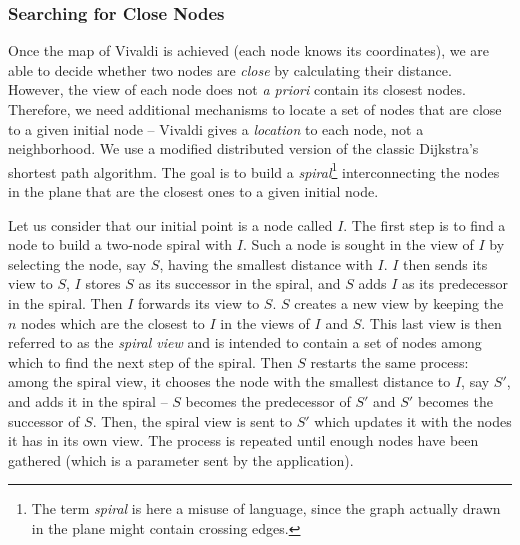 

\subsubsection*{Searching for Close Nodes}

Once the map of Vivaldi is achieved (each node knows its coordinates), we are able to
decide whether two nodes are \emph{close} by calculating their distance. However, the view
of each node does not \emph{a priori} contain its closest nodes. Therefore, we need
additional mechanisms to locate a set of nodes that are close to a given initial node --
Vivaldi gives a \emph{location} to each node, not a neighborhood. We use a modified
distributed version of the classic Dijkstra's shortest path algorithm. The goal is to
build a \emph{spiral}\footnote{The term \emph{spiral} is here a misuse of language, since
  the graph actually drawn in the plane might contain crossing edges.}  interconnecting
the nodes in the plane that are the closest ones to a given initial node.

Let us consider that our initial point is a node called $I$. The first step is to find a
node to build a two-node spiral with $I$. Such a node is sought in the view of $I$ by
selecting the node, say $S$, having the smallest distance with $I$. $I$ then sends its
view to $S$, $I$ stores $S$ as its successor in the spiral, and $S$ adds $I$ as its
predecessor in the spiral. Then $I$ forwards its view to $S$. $S$ creates a new view by
keeping the $n$ nodes which are the closest to $I$ in the views of $I$ and $S$. This last
view is then referred to as the \emph{spiral view} and is intended to contain a set of
nodes among which to find the next step of the spiral. Then $S$ restarts the same process:
among the spiral view, it chooses the node with the smallest distance to $I$, say $S'$,
and adds it in the spiral -- $S$ becomes the predecessor of $S'$ and $S'$ becomes the
successor of $S$. Then, the spiral view is sent to $S'$ which updates it with the nodes it
has in its own view. The process is repeated until enough nodes have been gathered (which
is a parameter sent by the application).

